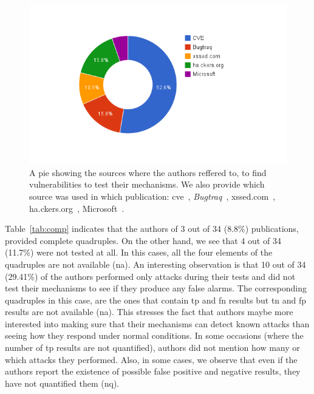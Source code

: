 \documentclass[conference]{IEEEtran}
\begin{document}
\begin{figure}
\begin{center}
\leavevmode
\includegraphics[scale=0.47]{defect-percentages.png}
\end{center}
\caption{\label{fig:defect_sources}A pie showing the sources
where the authors reffered to, to find vulnerabilities to test
their mechanisms. We also provide which source was used
in which publication:
{\sc cve}~\cite{XBS06,NLC07,PMP11,BK04,BV08,JB07,SMS13,WPLKK09,JKK06a,PS11},
{\it Bugtraq}~\cite{PB05,KKVJ06,JEP08},
{\sc xss}ed.com~\cite{NSS06,APKLM10},
ha.ckers.org~\cite{TNH07,PSC09,LV09},
Microsoft~\cite{RDWDE07}.}
\end{figure}

Table~\ref{tab:comp} indicates that the authors of 3 out of 34
(8.8\%) publications, provided complete quadruples.
On the other hand, we see that 4 out of
34 (11.7\%) were not tested at all.
In this cases, all the four elements of the
quadruples are not available ({\sc na}).
An interesting observation is that 10 out of 34
(29.41\%) of the authors performed only attacks
during their tests and did not test their mechanisms
to see if they produce any false alarms. The corresponding
quadruples in this case, are the ones that contain {\sc tp} and
{\sc fn} results but {\sc tn} and {\sc fp} results are not
available ({\sc na}). This stresses the fact that authors
maybe more interested into making sure that
their mechanisms can detect known attacks than seeing how
they respond under normal conditions.
In some occasions (where the number of {\sc tp} results
are not quantified), authors did not mention how many or
which attacks they performed.
Also, in some cases, we observe that even if
the authors report the existence of possible
false positive and negative results, they have not
quantified them ({\sc nq}).
\end{document}

